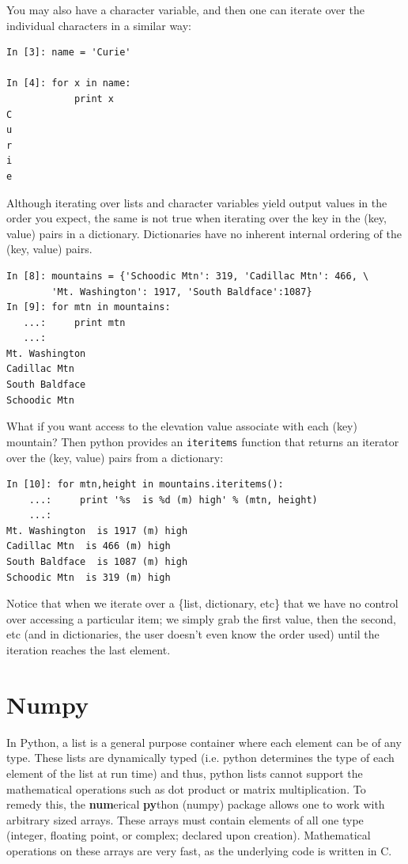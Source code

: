 You may also have a character variable, and then one can iterate over the individual characters in a similar way:
\begin{lstlisting}
In [3]: name = 'Curie'

In [4]: for x in name:
            print x
C
u
r
i
e
\end{lstlisting}
Although iterating over lists and character variables yield output values in the order you expect, the same is not true when iterating over the key in the (key, value) pairs in a dictionary. Dictionaries have no inherent internal ordering of the (key, value) pairs.
\begin{lstlisting}
In [8]: mountains = {'Schoodic Mtn': 319, 'Cadillac Mtn': 466, \
		'Mt. Washington': 1917, 'South Baldface':1087}
In [9]: for mtn in mountains: 
   ...:     print mtn
   ...:     
Mt. Washington
Cadillac Mtn
South Baldface
Schoodic Mtn
\end{lstlisting}
What if you want access to the elevation value associate with each (key) mountain? Then python provides an \lstinline{iteritems} function that returns an iterator over the (key, value) pairs from a dictionary:
\begin{lstlisting}
In [10]: for mtn,height in mountains.iteritems():
    ...:     print '%s  is %d (m) high' % (mtn, height)
    ...:     
Mt. Washington  is 1917 (m) high
Cadillac Mtn  is 466 (m) high
South Baldface  is 1087 (m) high
Schoodic Mtn  is 319 (m) high
\end{lstlisting}
Notice that when we iterate over a \{list, dictionary, etc\} that we have no control over accessing 
a particular item; we simply grab the first value, then the second, etc (and in dictionaries, the user doesn't even know the order used) until the iteration reaches the last element.

\section{Numpy}\label{sec:numpy}
In Python, a list is a general purpose container where each element can be of any type. 
These lists are dynamically typed (i.e. python determines the type of each element of the 
list at run time) and thus, python lists cannot support the mathematical operations such 
as dot product or matrix multiplication.
To remedy this, the \textbf{num}erical \textbf{py}thon (numpy) package allows one to work with arbitrary 
sized arrays. These arrays must contain elements of all one type (integer, floating 
point, or complex; declared upon creation). Mathematical operations on these arrays 
are very fast, as the underlying code is written in C. 

